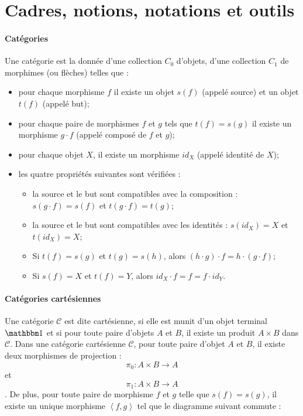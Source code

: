 \documentclass[12pt']{article}
\begin{document}
\section{Cadres, notions, notations et outils}

\paragraph{Catégories} Une catégorie est la donnée d'une collection $C_0$ d'objets, d'une collection $C_1$ de morphimes (ou flèches) telles que : 
\begin{itemize}
	\item pour chaque morphisme $f$ il existe un objet $s(f)$ (appelé source) et un objet $t(f)$ (appelé but);
	\item pour chaque paire de morphismes $f$ et $g$ tels que $t(f) = s(g)$ il existe un morphisme $g \cdot f$ (appelé composé de $f$ et $g$);
	\item pour chaque objet $X$, il existe un morphisme $id_X$ (appelé identité de $X$);
	\item les quatre propriétés suivantes sont vérifiées :
	\begin{itemize}
		\item la source et le but sont compatibles avec la composition : $s(g \cdot f) = s(f)$ et $t(g \cdot f) = t(g)$;
		\item la source et le but sont compatibles avec les identités : $s(id_X) = X$ et $t(id_X) = X$;
		\item Si $t(f) = s(g)$ et $t(g) = s(h)$, alors $(h \cdot g) \cdot f = h \cdot (g \cdot f)$;
		\item Si $s(f) = X$ et $t(f) = Y$, alors $id_X \cdot f = f = f \cdot id_Y$.
	\end{itemize}
\end{itemize}

\paragraph{Catégories cartésiennes} Une catégorie $\mathcal{C}$ est dite cartésienne, si elle est munit d'un objet terminal $\mathbbm 1$ et si pour toute paire d'objets $A$ et $B$, il existe un produit $A \times B$ dans $\mathcal C$.
Dans une catégorie cartésienne $\mathcal{C}$, pour toute paire d'objet $A$ et $B$, il existe deux morphismes de projection : $$\pi_0 : A \times B \rightarrow A$$ et $$\pi_1 : A \times B \rightarrow A$$. De plus, pour toute paire de morphisme $f$ et $g$ telle que $s(f) = s(g)$, il existe un unique morphisme $\left<f, g\right>$ tel que le diagramme suivant commute :
\end{document}
